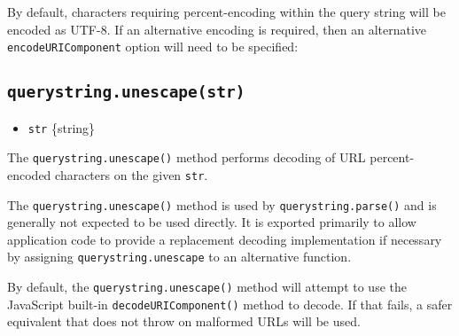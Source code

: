By default, characters requiring percent-encoding within the query
string will be encoded as UTF-8. If an alternative encoding is required,
then an alternative \texttt{encodeURIComponent} option will need to be
specified:

\begin{Shaded}
\begin{Highlighting}[]

\NormalTok{(\{ }\OperatorTok{:} \OperatorTok{,} \OperatorTok{:} \NormalTok{ \}}\OperatorTok{,} \OperatorTok{,} \OperatorTok{,}
\NormalTok{                      \{ }\OperatorTok{:}\OperatorTok{;}
\end{Highlighting}
\end{Shaded}

\subsection{\texorpdfstring{\texttt{querystring.unescape(str)}}{querystring.unescape(str)}}\label{querystring.unescapestr}

\begin{itemize}
\tightlist
\item
  \texttt{str} \{string\}
\end{itemize}

The \texttt{querystring.unescape()} method performs decoding of URL
percent-encoded characters on the given \texttt{str}.

The \texttt{querystring.unescape()} method is used by
\texttt{querystring.parse()} and is generally not expected to be used
directly. It is exported primarily to allow application code to provide
a replacement decoding implementation if necessary by assigning
\texttt{querystring.unescape} to an alternative function.

By default, the \texttt{querystring.unescape()} method will attempt to
use the JavaScript built-in \texttt{decodeURIComponent()} method to
decode. If that fails, a safer equivalent that does not throw on
malformed URLs will be used.
